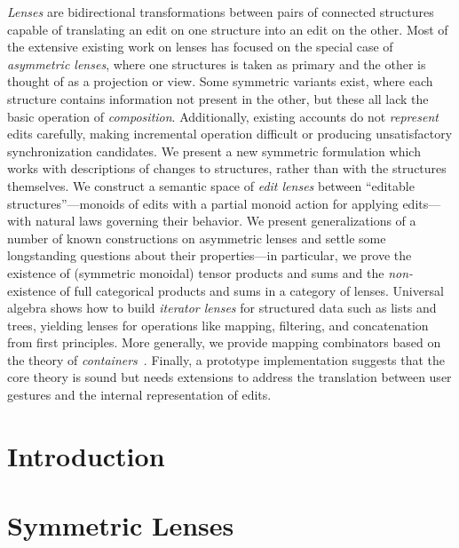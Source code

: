 \documentclass[12pt]{report}
\numberwithin{equation}{section}
\begin{document}
\noindent
{\em Lenses} are bidirectional transformations between pairs of connected
structures capable of translating an edit on one structure into an edit on
the other. Most of the extensive existing work on lenses has focused on the
special case of {\em asymmetric lenses}, where one structures is taken as
primary and the other is thought of as a projection or view. Some symmetric
variants exist, where each structure contains information not present in the
other, but these all lack the basic operation of {\em composition}.
Additionally, existing accounts do not {\em represent} edits carefully,
making incremental operation difficult or producing unsatisfactory
synchronization candidates. We present a new symmetric formulation which
works with descriptions of changes to structures, rather than with the
structures themselves. We construct a semantic space of {\em edit lenses}
between ``editable structures''---monoids of edits with a partial monoid
action for applying edits---with natural laws governing their behavior. We
present generalizations of a number of known constructions on asymmetric
lenses and settle some longstanding questions about their properties---in
particular, we prove the existence of (symmetric monoidal) tensor products
and sums and the {\em non-}existence of full categorical products and sums
in a category of lenses. Universal algebra shows how to build {\em iterator
lenses} for structured data such as lists and trees, yielding lenses for
operations like mapping, filtering, and concatenation from first principles.
More generally, we provide mapping combinators based on the theory of {\em
containers}~\cite{1195941}. Finally, a prototype implementation suggests
that the core theory is sound but needs extensions to address the
translation between user gestures and the internal representation of edits.

\newpage

\tableofcontents

\newpage

\listoftables

\listoffigures

\newpage
\singlespacing
{}

\chapter{Introduction}
\label{chap:introduction}
\label{chap:intro}



\chapter{Symmetric Lenses}
\label{chap:complement}
\label{chap:symmetric}
\label{chap:symmetry}
\label{chap:symm}
\end{document}
